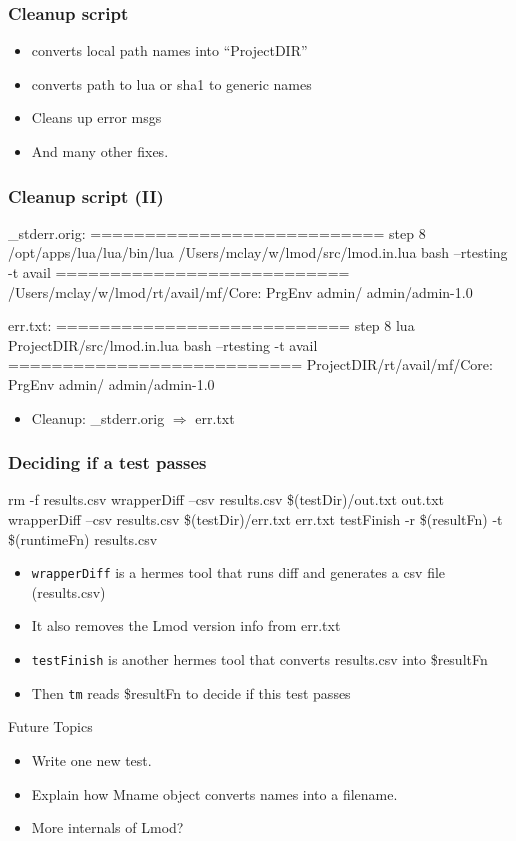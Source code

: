 \documentclass{beamer}
\begin{document}
\begin{frame}[fragile]
  \frametitle{Cleanup script}
    {\tiny
\begin{semiverbatim}
\end{semiverbatim}
    }
    \begin{itemize}
      \item converts local path names into ``ProjectDIR''
      \item converts path to lua or sha1 to generic names
      \item Cleans up error msgs 
      \item And many other fixes.
    \end{itemize}
\end{frame}

\begin{frame}[fragile]
  \frametitle{Cleanup script (II)}
    {\tiny
\begin{semiverbatim}
{\color{blue} \_stderr.orig}:
===========================
step 8
/opt/apps/lua/lua/bin/lua /Users/mclay/w/lmod/src/lmod.in.lua bash --rtesting -t avail
===========================
/Users/mclay/w/lmod/rt/avail/mf/Core:
PrgEnv
admin/
admin/admin-1.0
    
{\color{blue} err.txt}:
===========================
step 8
lua ProjectDIR/src/lmod.in.lua bash --rtesting -t avail
===========================
ProjectDIR/rt/avail/mf/Core:
PrgEnv
admin/
admin/admin-1.0
\end{semiverbatim}
    }
    \begin{itemize}
      \item Cleanup: \_stderr.orig $\Rightarrow$ err.txt
    \end{itemize}
\end{frame}

\begin{frame}[fragile]
  \frametitle{Deciding if a test passes}
    {\tiny
\begin{semiverbatim}
rm -f results.csv
wrapperDiff --csv results.csv \$(testDir)/out.txt out.txt
wrapperDiff --csv results.csv \$(testDir)/err.txt err.txt
testFinish -r \$(resultFn) -t \$(runtimeFn) results.csv
\end{semiverbatim}
    }
    \begin{itemize}
      \item \texttt{wrapperDiff} is a hermes tool that runs diff and
        generates a csv file (results.csv)
      \item It also removes the Lmod version info from err.txt
      \item \texttt{testFinish} is another hermes tool that converts
        results.csv into \$resultFn
      \item Then \texttt{tm} reads \$resultFn to decide if this test passes
    \end{itemize}
\end{frame}

\begin{frame}{Future Topics}
  \begin{itemize}
    \item Write one new test.
    \item Explain how Mname object converts names into a filename.
    \item More internals of Lmod?
  \end{itemize}
\end{frame}
\end{document}
